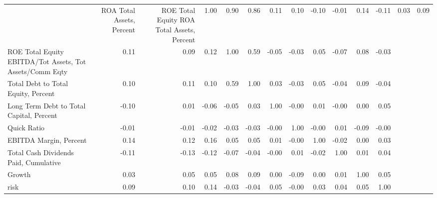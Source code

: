 \begin{tabular}{lrrrrrrrrrrr}
\toprule
 & ROA Total Assets, Percent & ROE Total Equity %
\midrule
ROA Total Assets, Percent & 1.00 & 0.90 & 0.86 & 0.11 & 0.10 & -0.10 & -0.01 & 0.14 & -0.11 & 0.03 & 0.09 \\
ROE Total Equity %
EBITDA/Tot Assets, %
Tot Assets/Comm Eqty & 0.11 & 0.09 & 0.12 & 1.00 & 0.59 & -0.05 & -0.03 & 0.05 & -0.07 & 0.08 & -0.03 \\
Total Debt to Total Equity, Percent & 0.10 & 0.11 & 0.10 & 0.59 & 1.00 & 0.03 & -0.03 & 0.05 & -0.04 & 0.09 & -0.04 \\
Long Term Debt to Total Capital, Percent & -0.10 & 0.01 & -0.06 & -0.05 & 0.03 & 1.00 & -0.00 & 0.01 & -0.00 & 0.00 & 0.05 \\
Quick Ratio & -0.01 & -0.01 & -0.02 & -0.03 & -0.03 & -0.00 & 1.00 & -0.00 & 0.01 & -0.09 & -0.00 \\
EBITDA Margin, Percent & 0.14 & 0.12 & 0.16 & 0.05 & 0.05 & 0.01 & -0.00 & 1.00 & -0.02 & 0.00 & 0.03 \\
Total Cash Dividends Paid, Cumulative & -0.11 & -0.13 & -0.12 & -0.07 & -0.04 & -0.00 & 0.01 & -0.02 & 1.00 & 0.01 & 0.04 \\
Growth & 0.03 & 0.05 & 0.05 & 0.08 & 0.09 & 0.00 & -0.09 & 0.00 & 0.01 & 1.00 & 0.05 \\
risk & 0.09 & 0.10 & 0.14 & -0.03 & -0.04 & 0.05 & -0.00 & 0.03 & 0.04 & 0.05 & 1.00 \\
\bottomrule
\end{tabular}
